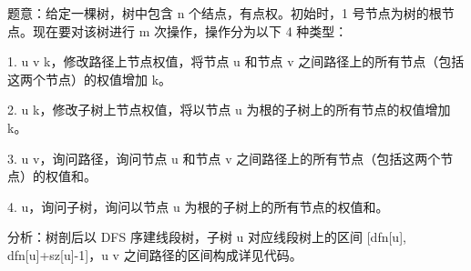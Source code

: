 题意：给定一棵树，树中包含 n 个结点，有点权。初始时，1 号节点为树的根节点。现在要对该树进行 m 次操作，操作分为以下 4 种类型：

1. u v k，修改路径上节点权值，将节点 u 和节点 v 之间路径上的所有节点（包括这两个节点）的权值增加 k。

2. u k，修改子树上节点权值，将以节点 u 为根的子树上的所有节点的权值增加 k。

3. u v，询问路径，询问节点 u 和节点 v 之间路径上的所有节点（包括这两个节点）的权值和。

4. u，询问子树，询问以节点 u 为根的子树上的所有节点的权值和。

分析：树剖后以 DFS 序建线段树，子树 u 对应线段树上的区间 [dfn[u], dfn[u]+sz[u]-1]，u v 之间路径的区间构成详见代码。
